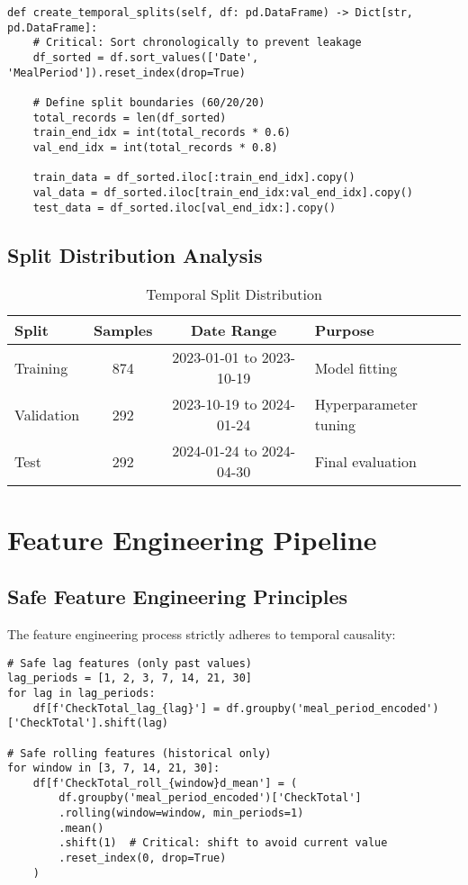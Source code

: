 \documentclass[12pt,a4paper]{article}
\begin{document}
\begin{lstlisting}[caption=Temporal Splitting Implementation]
def create_temporal_splits(self, df: pd.DataFrame) -> Dict[str, pd.DataFrame]:
    # Critical: Sort chronologically to prevent leakage
    df_sorted = df.sort_values(['Date', 'MealPeriod']).reset_index(drop=True)
    
    # Define split boundaries (60/20/20)
    total_records = len(df_sorted)
    train_end_idx = int(total_records * 0.6)
    val_end_idx = int(total_records * 0.8)
    
    train_data = df_sorted.iloc[:train_end_idx].copy()
    val_data = df_sorted.iloc[train_end_idx:val_end_idx].copy()
    test_data = df_sorted.iloc[val_end_idx:].copy()
\end{lstlisting}

\subsection{Split Distribution Analysis}

\begin{table}[h]
\centering
\begin{tabular}{@{}lccl@{}}
\toprule
\textbf{Split} & \textbf{Samples} & \textbf{Date Range} & \textbf{Purpose} \\
\midrule
Training & 874 & 2023-01-01 to 2023-10-19 & Model fitting \\
Validation & 292 & 2023-10-19 to 2024-01-24 & Hyperparameter tuning \\
Test & 292 & 2024-01-24 to 2024-04-30 & Final evaluation \\
\bottomrule
\end{tabular}
\caption{Temporal Split Distribution}
\end{table}

\section{Feature Engineering Pipeline}

\subsection{Safe Feature Engineering Principles}

The feature engineering process strictly adheres to temporal causality:

\begin{lstlisting}[caption=Safe Lag Feature Creation]
# Safe lag features (only past values)
lag_periods = [1, 2, 3, 7, 14, 21, 30]
for lag in lag_periods:
    df[f'CheckTotal_lag_{lag}'] = df.groupby('meal_period_encoded')['CheckTotal'].shift(lag)

# Safe rolling features (historical only)
for window in [3, 7, 14, 21, 30]:
    df[f'CheckTotal_roll_{window}d_mean'] = (
        df.groupby('meal_period_encoded')['CheckTotal']
        .rolling(window=window, min_periods=1)
        .mean()
        .shift(1)  # Critical: shift to avoid current value
        .reset_index(0, drop=True)
    )
\end{lstlisting}
\end{document}
